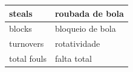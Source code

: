\begin{table}[htbp]
\begin{longtable}{|l|l|}
		steals                       & roubada de bola                                                                                                                             \\ \hline
		blocks                       & bloqueio de bola                                                                                                                            \\ \hline
		turnovers                    & rotatividade                                                                                                                                \\ \hline
		total fouls                    & falta total                                                                                                                                 \\ \hline		
	\end{longtable}
\end{table}
\newpage
